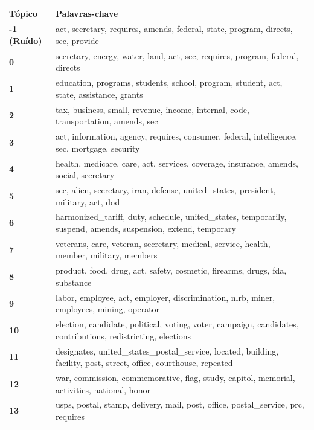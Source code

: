 \begin{table}[htpb]
    \centering
    \scriptsize
    \begin{tabularx}{\textwidth}{@{}l X@{}}
        \toprule
        \textbf{Tópico} & \textbf{Palavras-chave} \\
        \midrule
        \textbf{-1 (Ruído)} & act, secretary, requires, amends, federal, state, program, directs, sec, provide \\
        \textbf{0} & secretary, energy, water, land, act, sec, requires, program, federal, directs \\
        \textbf{1} & education, programs, students, school, program, student, act, state, assistance, grants \\
        \textbf{2} & tax, business, small, revenue, income, internal, code, transportation, amends, sec \\
        \textbf{3} & act, information, agency, requires, consumer, federal, intelligence, sec, mortgage, security \\
        \textbf{4} & health, medicare, care, act, services, coverage, insurance, amends, social, secretary \\
        \textbf{5} & sec, alien, secretary, iran, defense, united\_states, president, military, act, dod \\
        \textbf{6} & harmonized\_tariff, duty, schedule, united\_states, temporarily, suspend, amends, suspension, extend, temporary \\
        \textbf{7} & veterans, care, veteran, secretary, medical, service, health, member, military, members \\
        \textbf{8} & product, food, drug, act, safety, cosmetic, firearms, drugs, fda, substance \\
        \textbf{9} & labor, employee, act, employer, discrimination, nlrb, miner, employees, mining, operator \\
        \textbf{10} & election, candidate, political, voting, voter, campaign, candidates, contributions, redistricting, elections \\
        \textbf{11} & designates, united\_states\_postal\_service, located, building, facility, post, street, office, courthouse, repeated \\
        \textbf{12} & war, commission, commemorative, flag, study, capitol, memorial, activities, national, honor \\
        \textbf{13} & usps, postal, stamp, delivery, mail, post, office, postal\_service, prc, requires \\

\end{tabularx}
\end{table}

